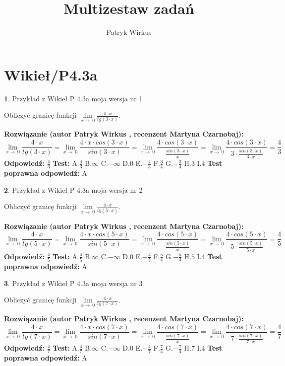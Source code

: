 \documentclass[12pt, a4paper]{article}
\title{Multizestaw zadań}
\author{Patryk Wirkus}
\date{}
\theoremstyle{definition} %
\newtheorem{zad}{}
\newcommand{\kategoria}[1]{\section{#1}}
\newcommand{\zadStart}[1]{\begin{zad}#1\newline}
\newcommand{\zadStop}{\end{zad}}
\newcommand{\rozwStart}[2]{\noindent \textbf{Rozwiązanie (autor #1 , recenzent #2): }\newline}
\newcommand{\rozwStop}{\newline}
\newcommand{\odpStart}{\noindent \textbf{Odpowiedź:}\newline}
\newcommand{\odpStop}{\newline}
\newcommand{\testStart}{\noindent \textbf{Test:}\newline}
\newcommand{\testStop}{\newline}
\newcommand{\kluczStart}{\noindent \textbf{Test poprawna odpowiedź:}\newline}
\newcommand{\kluczStop}{\newline}
\begin{document}
\maketitle

\kategoria{Wikieł/P4.3a}


\zadStart{Przykład z Wikieł P 4.3a moja wersja nr 1}


Obliczyć granicę funkcji $\lim\limits_{x\to\ 0}\frac{4 \cdot x}{tg(3 \cdot x)}$.
\zadStop
\rozwStart{Patryk Wirkus}{Martyna Czarnobaj}
$$\lim\limits_{x\to\ 0}\frac{4 \cdot x}{tg(3 \cdot x)}=\lim\limits_{x\to\ 0}\frac{4 \cdot x \cdot cos(3 \cdot x)}{sin(3 \cdot x)}=\lim\limits_{x\to\ 0}\frac{4 \cdot cos(3 \cdot x)}{\frac{sin(3 \cdot x)}{x}}=\lim\limits_{x\to\ 0}\frac{4 \cdot cos(3 \cdot x)}{3 \cdot \frac{sin(3 \cdot x)}{3 \cdot x}} = \frac{4}{3}$$
\rozwStop
\odpStart
$\frac{4}{3}$
\odpStop
\testStart
A.$\frac{4}{3}$
B.$\infty$
C.$-\infty$
D.$0$
E.$-\frac{4}{3}$
F.$\frac{3}{4}$
G.$-\frac{3}{4}$
H.$3$
I.$4$
\testStop
\kluczStart
A
\kluczStop



\zadStart{Przykład z Wikieł P 4.3a moja wersja nr 2}


Obliczyć granicę funkcji $\lim\limits_{x\to\ 0}\frac{4 \cdot x}{tg(5 \cdot x)}$.
\zadStop
\rozwStart{Patryk Wirkus}{Martyna Czarnobaj}
$$\lim\limits_{x\to\ 0}\frac{4 \cdot x}{tg(5 \cdot x)}=\lim\limits_{x\to\ 0}\frac{4 \cdot x \cdot cos(5 \cdot x)}{sin(5 \cdot x)}=\lim\limits_{x\to\ 0}\frac{4 \cdot cos(5 \cdot x)}{\frac{sin(5 \cdot x)}{x}}=\lim\limits_{x\to\ 0}\frac{4 \cdot cos(5 \cdot x)}{5 \cdot \frac{sin(5 \cdot x)}{5 \cdot x}} = \frac{4}{5}$$
\rozwStop
\odpStart
$\frac{4}{5}$
\odpStop
\testStart
A.$\frac{4}{5}$
B.$\infty$
C.$-\infty$
D.$0$
E.$-\frac{4}{5}$
F.$\frac{5}{4}$
G.$-\frac{5}{4}$
H.$5$
I.$4$
\testStop
\kluczStart
A
\kluczStop



\zadStart{Przykład z Wikieł P 4.3a moja wersja nr 3}


Obliczyć granicę funkcji $\lim\limits_{x\to\ 0}\frac{4 \cdot x}{tg(7 \cdot x)}$.
\zadStop
\rozwStart{Patryk Wirkus}{Martyna Czarnobaj}
$$\lim\limits_{x\to\ 0}\frac{4 \cdot x}{tg(7 \cdot x)}=\lim\limits_{x\to\ 0}\frac{4 \cdot x \cdot cos(7 \cdot x)}{sin(7 \cdot x)}=\lim\limits_{x\to\ 0}\frac{4 \cdot cos(7 \cdot x)}{\frac{sin(7 \cdot x)}{x}}=\lim\limits_{x\to\ 0}\frac{4 \cdot cos(7 \cdot x)}{7 \cdot \frac{sin(7 \cdot x)}{7 \cdot x}} = \frac{4}{7}$$
\rozwStop
\odpStart
$\frac{4}{7}$
\odpStop
\testStart
A.$\frac{4}{7}$
B.$\infty$
C.$-\infty$
D.$0$
E.$-\frac{4}{7}$
F.$\frac{7}{4}$
G.$-\frac{7}{4}$
H.$7$
I.$4$
\testStop
\kluczStart
A
\kluczStop
\end{document}
